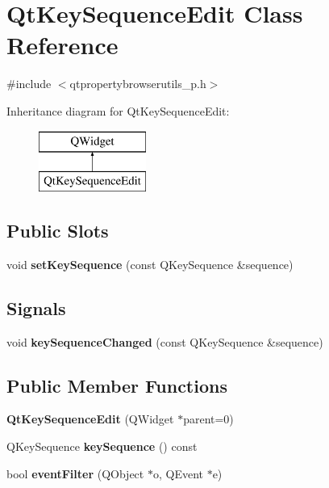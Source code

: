 \section{Qt\+Key\+Sequence\+Edit Class Reference}
\label{classQtKeySequenceEdit}


{\ttfamily \#include $<$qtpropertybrowserutils\+\_\+p.\+h$>$}

Inheritance diagram for Qt\+Key\+Sequence\+Edit\+:\begin{figure}[H]
\begin{center}
\leavevmode
\includegraphics[height=2.000000cm]{classQtKeySequenceEdit}
\end{center}
\end{figure}
\subsection*{Public Slots}
\begin{DoxyCompactItemize}
\item 
void {\bf set\+Key\+Sequence} (const Q\+Key\+Sequence \&sequence)
\end{DoxyCompactItemize}
\subsection*{Signals}
\begin{DoxyCompactItemize}
\item 
void {\bf key\+Sequence\+Changed} (const Q\+Key\+Sequence \&sequence)
\end{DoxyCompactItemize}
\subsection*{Public Member Functions}
\begin{DoxyCompactItemize}
\item 
{\bf Qt\+Key\+Sequence\+Edit} (Q\+Widget $\ast$parent=0)
\item 
Q\+Key\+Sequence {\bf key\+Sequence} () const 
\item 
bool {\bf event\+Filter} (Q\+Object $\ast$o, Q\+Event $\ast$e)
\end{DoxyCompactItemize}
